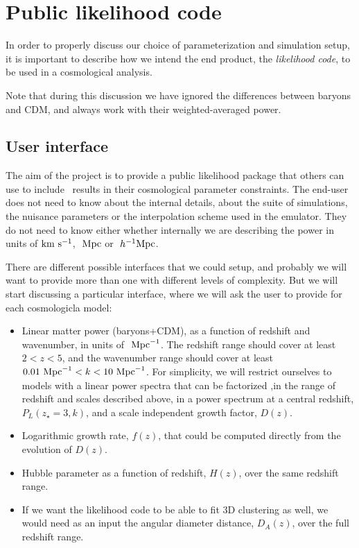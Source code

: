 \section{Public likelihood code} \label{sec:like}

In order to properly discuss our choice of parameterization and simulation
setup, it is important to describe how we intend the end product,
the \textit{likelihood code}, to be used in a cosmological analysis.

Note that during this discussion we have ignored the differences between 
baryons and CDM, and always work with their weighted-averaged power. 


\subsection{User interface}

The aim of the project is to provide a public likelihood package that others
can use to include \lya\ results in their cosmological parameter constraints.
The end-user does not need to know about the internal details, about the 
suite of simulations, the nuisance parameters or the interpolation scheme 
used in the emulator.
They do not need to know either whether internally we are describing the 
power in units of ${\rm km~s^{-1}}$, $\ \text{Mpc}$ or $\ h^{-1}\text{Mpc}$. 

There are different possible interfaces that we could setup, and probably 
we will want to provide more than one with different levels of complexity.
But we will start discussing a particular interface, where we will ask 
the user to provide for each cosmologicla model:
\begin{itemize}
 \item Linear matter power (baryons+CDM), as a function of redshift and 
  wavenumber, in units of $\ \text{Mpc}^{-1}$. 
  The redshift range should cover at least $2 < z < 5$, and the wavenumber
  range should cover at least $0.01 \ \text{Mpc}^{-1} < k < 10 \ \text{Mpc}^{-1}$. 
  For simplicity, we will restrict ourselves to models with a linear power 
  spectra that can be factorized ,in the range of redshift and scales 
  described above, in a power spectrum at a central redshift, 
  $P_L(z_\star=3,k)$, and a scale independent growth factor, $D(z)$.
 \item Logarithmic growth rate, $f(z)$, that could be computed directly
  from the evolution of $D(z)$.
 \item Hubble parameter as a function of redshift, $H(z)$, over the same 
  redshift range.
 \item If we want the likelihood code to be able to fit 3D clustering as well,
  we would need as an input the angular diameter distance, $D_A(z)$, 
  over the full redshift range.
\end{itemize}


